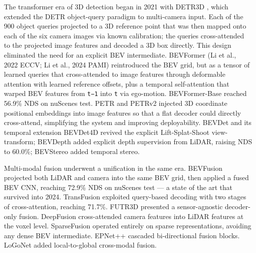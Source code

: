 \documentclass{article}
\begin{document}
The transformer era of 3D detection began in 2021 with DETR3D \citep{wang2022detr3d3dobjectdete}, which extended the DETR object-query paradigm to multi-camera input. Each of the 900 object queries projected to a 3D reference point that was then mapped onto each of the six camera images via known calibration; the queries cross-attended to the projected image features and decoded a 3D box directly. This design eliminated the need for an explicit BEV intermediate. BEVFormer (Li et al., 2022 ECCV; Li et al., 2024 PAMI) reintroduced the BEV grid, but as a tensor of learned queries that cross-attended to image features through deformable attention with learned reference offsets, plus a temporal self-attention that warped BEV features from \texttt{t−1} into \texttt{t} via ego-motion. BEVFormer-Base reached 56.9\% NDS on nuScenes test. PETR \citep{liu2022petrpositionembedd} and PETRv2 \citep{liu2022petrpositionembedd} injected 3D coordinate positional embeddings into image features so that a flat decoder could directly cross-attend, simplifying the system and improving deployability. BEVDet \citep{huang2021bevdethighperforma} and its temporal extension BEVDet4D revived the explicit Lift-Splat-Shoot view-transform; BEVDepth \citep{li2023bevdepthacquisitio} added explicit depth supervision from LiDAR, raising NDS to 60.0\%; BEVStereo \citep{li2023bevdepthacquisitio} added temporal stereo.

Multi-modal fusion underwent a unification in the same era. BEVFusion \citep{liu2023bevfusionmultitask} projected both LiDAR and camera into the same BEV grid, then applied a fused BEV CNN, reaching 72.9\% NDS on nuScenes test --- a state of the art that survived into 2024. TransFusion exploited query-based decoding with two stages of cross-attention, reaching 71.7\%. FUTR3D \citep{chen2023futr3daunifiedsens} presented a sensor-agnostic decoder-only fusion. DeepFusion \citep{li2022bevformerlearningb} cross-attended camera features into LiDAR features at the voxel level. SparseFusion \citep{xie2023sparsefusionfusing} operated entirely on sparse representations, avoiding any dense BEV intermediate. EPNet++ \citep{liu2022petrpositionembedd} cascaded bi-directional fusion blocks. LoGoNet \citep{li2023bevdepthacquisitio} added local-to-global cross-modal fusion.
\end{document}
